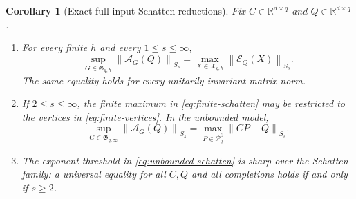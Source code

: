\documentclass[journal,10pt]{IEEEtran}
\newtheorem{corollary}[theorem]{Corollary}
\theoremstyle{definition}
\theoremstyle{remark}
\newcommand{\R}{\mathbb R}
\newcommand{\cX}{\mathcal X}
\newcommand{\cP}{\mathcal P}
\newcommand{\cE}{\mathcal E}
\newcommand{\cA}{\mathcal A}
\newcommand{\fG}{\mathfrak G}
\newcommand{\norm}[1]{\left\lVert #1\right\rVert}
\begin{document}
\begin{corollary}[Exact full-input Schatten reductions]
\label{cor:schatten}
Fix $C\in\R^{d\times q}$ and $Q\in\R^{d\times q}$.

\begin{enumerate}[label=\textup{(\roman*)},leftmargin=2.1em]
\item For every finite $h$ and every $1\leq s\leq\infty$,
\begin{equation}
  \sup_{G\in\fG_{q,h}}\norm{\cA_G(Q)}_{S_s}
  =\max_{X\in\cX_{q,h}}\norm{\cE_Q(X)}_{S_s}.
  \label{eq:finite-schatten}
\end{equation}
The same equality holds for every unitarily invariant matrix norm.

\item If $2\leq s\leq\infty$, the finite maximum in
\eqref{eq:finite-schatten} may be restricted to the vertices in
\eqref{eq:finite-vertices}.  In the unbounded model,
\begin{equation}
  \sup_{G\in\fG_{q,\infty}}\norm{\cA_G(Q)}_{S_s}
  =\max_{P\in\cP_q^\partial}\norm{CP-Q}_{S_s}.
  \label{eq:unbounded-schatten}
\end{equation}

\item The exponent threshold in \eqref{eq:unbounded-schatten} is sharp over
the Schatten family: a universal equality for all $C,Q$ and all completions
holds if and only if $s\geq2$.
\end{enumerate}
\end{corollary}
\end{document}
